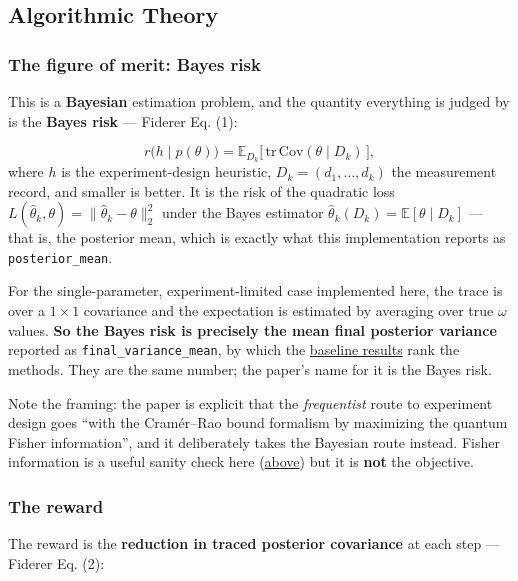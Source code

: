 \documentclass[12pt,a4paper]{article}
\begin{document}
\FloatBarrier
\subsection{Algorithmic Theory}\label{sec:algorithmic-theory}

\subsubsection{The figure of merit: Bayes risk}\label{sec:the-figure-of-merit-bayes-risk}
This is a \textbf{Bayesian} estimation problem, and the quantity everything is judged by is the \textbf{Bayes risk} --- Fiderer Eq. (1):

\begin{equation}
r\bigl(h \mid p(\theta)\bigr) = \mathbb{E}_{D_k}\bigl[\, \mathrm{tr}\,\mathrm{Cov}(\theta \mid D_k) \,\bigr],
\label{eq:bayes-risk}
\end{equation}
where $h$ is the experiment-design heuristic, $D_k = (d_1,\dots,d_k)$ the measurement record, and smaller is better. It is the risk of the quadratic loss $L(\hat\theta_k, \theta) = \lVert\hat\theta_k - \theta\rVert_2^2$ under the Bayes estimator $\hat\theta_k(D_k) = \mathbb{E}[\theta \mid D_k]$ --- that is, the posterior mean, which is exactly what this implementation reports as \texttt{posterior\_\allowbreak{}mean}.

For the single-parameter, experiment-limited case implemented here, the trace is over a $1\times1$ covariance and the expectation is estimated by averaging over true $\omega$ values. \textbf{So the Bayes risk is precisely the mean final posterior variance} reported as \texttt{final\_\allowbreak{}variance\_\allowbreak{}mean}, by which the \hyperref[sec:baseline-results]{baseline results} rank the methods. They are the same number; the paper's name for it is the Bayes risk.

Note the framing: the paper is explicit that the \emph{frequentist} route to experiment design goes ``with the Cram\'er--Rao bound formalism by maximizing the quantum Fisher information'', and it deliberately takes the Bayesian route instead. Fisher information is a useful sanity check here (\hyperref[sec:aside-why-long-interrogation-times-stop-helping]{above}) but it is \textbf{not} the objective.

\subsubsection{The reward}\label{sec:the-reward}
The reward is the \textbf{reduction in traced posterior covariance} at each step --- Fiderer Eq. (2):
\end{document}
